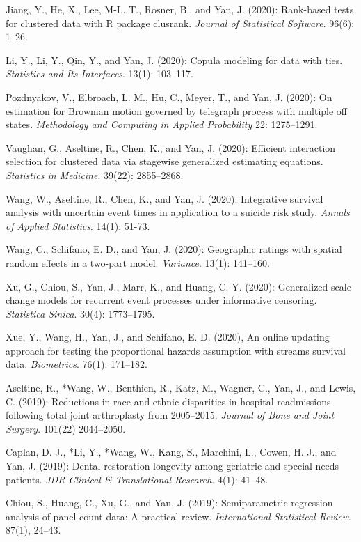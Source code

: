 \documentclass[Statistics]{vita}
\begin{document}
\begin{vita}
\begin{Publications}
\begin{RefereedJournalArticles}
  \item *Jiang, Y., He, X., Lee, M-L. T., Rosner, B., and Yan, J. (2020): Rank-based tests for clustered data with R package clusrank. {\em Journal of Statistical Software\/}. 96(6): 1--26.
  \item *Li, Y., Li, Y., Qin, Y., and Yan, J. (2020): Copula modeling for data with ties.  {\em Statistics and Its Interfaces\/}. 13(1): 103--117.
  \item Pozdnyakov, V., Elbroach, L. M., Hu, C., Meyer, T., and Yan, J. (2020): On estimation for Brownian motion governed by telegraph process with multiple off states. {\em Methodology and Computing in Applied Probability\/} 22: 1275--1291.
  \item *Vaughan, G., Aseltine, R., Chen, K., and Yan, J. (2020): Efficient interaction selection for clustered data via stagewise generalized estimating equations. {\em Statistics in Medicine\/}. 39(22): 2855--2868.
  \item *Wang, W., Aseltine, R., Chen, K., and Yan, J. (2020): Integrative survival analysis with uncertain event times in application to a suicide risk study. {\em Annals of Applied Statistics\/}. 14(1): 51-73.      
  \item *Wang, C., Schifano, E. D., and Yan, J. (2020): Geographic ratings with spatial random effects in a two-part model. {\em Variance\/}. 13(1): 141--160.
  \item Xu, G., Chiou, S., Yan, J., Marr, K., and Huang, C.-Y. (2020): Generalized scale-change models for recurrent event processes under informative censoring. {\em Statistica Sinica\/}. 30(4): 1773--1795.
  \item *Xue, Y., Wang, H., Yan, J., and Schifano, E. D. (2020), An online updating approach for testing the proportional hazards assumption with streams survival data. {\em Biometrics\/}. 76(1): 171--182.
  \item Aseltine, R., *Wang, W., Benthien, R., Katz, M., Wagner, C., Yan, J., and Lewis, C. (2019): Reductions in race and ethnic disparities in hospital readmissions following total joint arthroplasty from 2005--2015. {\em Journal of Bone and Joint Surgery\/}. 101(22) 2044--2050. 
 \item Caplan, D. J., *Li, Y., *Wang, W., Kang, S., Marchini, L., Cowen, H. J., and Yan, J. (2019): Dental restoration longevity among geriatric and special needs patients. {\em JDR Clinical \& Translational Research\/}. 4(1): 41--48.
  \item Chiou, S., Huang, C., Xu, G., and Yan, J. (2019): Semiparametric regression analysis of panel count data: A practical review. {\em International Statistical Review\/}. 87(1), 24--43.

\end{RefereedJournalArticles}
\end{Publications}
\end{vita}
\end{document}
